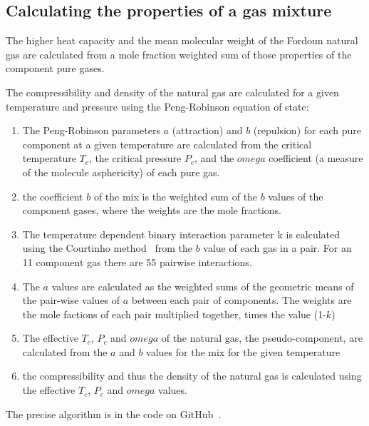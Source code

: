 \documentclass[5p]{elsarticle} %
\begin{document}
\subsection{Calculating the properties of a gas mixture}
\label{sec:gasmix}
The higher heat capacity and the mean molecular weight of the Fordoun natural gas are calculated from a mole fraction weighted sum of those properties of the component pure gases.

The compressibility and density of the natural gas are calculated for a given temperature and pressure using the Peng-Robinson equation of state: 

\begin{enumerate}
\item The Peng-Robinson\citep{Pina-Martinez2019} parameters $a$ (attraction) and $b$ (repulsion) for each pure component at a given temperature are calculated from the critical temperature $T_c$, the critical pressure $P_c$, and the $omega$ coefficient (a measure of the molecule asphericity) of each pure gas.
    \item the coefficient $b$ of the mix is  the weighted sum of the $b$ values of the component gases, where the weights are the mole fractions. 
    \item The temperature dependent binary interaction parameter k is calculated using the Courtinho method~\cite{Privat2023} from the $b$ value of each gas in a pair. For an 11 component gas there are 55 pairwise interactions.
    \item The $a$ values are calculated as the weighted sums of the geometric means of the pair-wise values of $a$ between each pair of components. The weights are the mole factions of each pair multiplied together, times the value (1-$k$)
    \item The effective $T_c$, $P_c$ and $omega$ of the natural gas, the pseudo-component,  are calculated from the $a$ and $b$ values for the mix for the given temperature
    \item the compressibility and thus the density of the natural gas is calculated using the effective $T_c$, $P_c$ and $omega$ values.
\end{enumerate}
The precise algorithm is in the code on GitHub~\cite{Sargents_github}.
\end{document}
